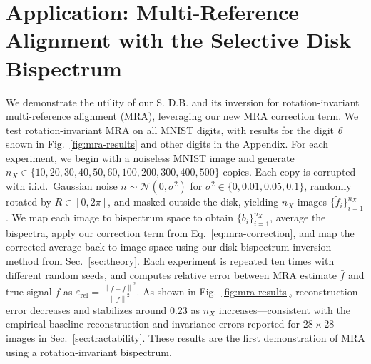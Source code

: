 \section{Application: Multi-Reference Alignment with the Selective Disk Bispectrum}

We demonstrate the utility of our S. D.B. and its inversion for rotation-invariant multi-reference alignment (MRA), leveraging our new MRA correction term. We test rotation-invariant MRA on all MNIST digits, with results for the digit \textit{6} shown in Fig.~\ref{fig:mra-results} and other digits in the Appendix. For each experiment, we begin with a noiseless MNIST image and generate
\( n_X \in \{10, 20, 30, 40, 50, 60, 100, 200, 300, 400, 500\} \) copies. Each copy is corrupted with i.i.d.\ Gaussian noise
\( n \sim \mathcal{N}(0, \sigma^2) \) for
\( \sigma^2 \in \{0, 0.01, 0.05, 0.1\} \), randomly rotated by
\( R \in [0, 2\pi] \), and masked outside the disk, yielding
\( n_X \) images \( \{\tilde{f}_i\}_{i=1}^{n_X} \). We map each image to bispectrum space to obtain \( \{b_i\}_{i=1}^{n_X} \), average the bispectra, apply our correction term from Eq.~\ref{eq:mra-correction}, and map the corrected average back to image space using our disk bispectrum inversion method from Sec.~\ref{sec:theory}. Each experiment is repeated ten times with different random seeds, and computes relative error between MRA estimate $\bar{f}$ and true signal $f$ as $\varepsilon_{\text{rel}} = \frac{\left\lVert \bar{f} - f \right\rVert^2}{\left\lVert f \right\rVert^2}$. As shown in Fig.~\ref{fig:mra-results}, reconstruction error decreases and stabilizes around 0.23 as \( n_X \) increases—consistent with the empirical baseline reconstruction and invariance errors reported for $28\times28$ images in Sec.~\ref{sec:tractability}. These results are the first demonstration of MRA using a rotation-invariant bispectrum.
